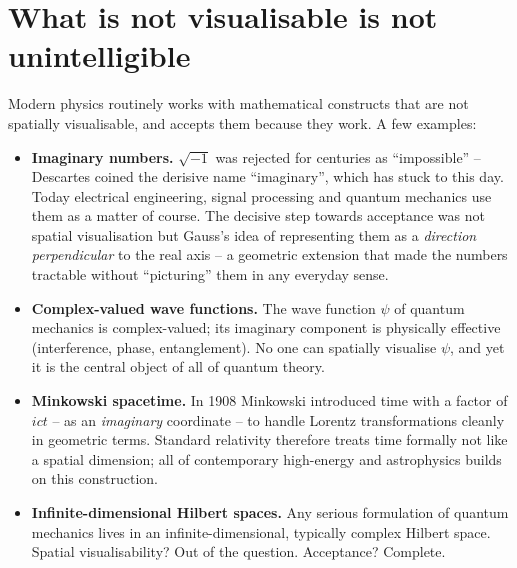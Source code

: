 \section{What is not visualisable is not unintelligible}

Modern physics routinely works with mathematical constructs that are
not spatially visualisable, and accepts them because they work. A few
examples:

\begin{itemize}[leftmargin=2em,itemsep=4pt,topsep=4pt]
  \item \textbf{Imaginary numbers.} $\sqrt{-1}$ was rejected for
        centuries as ``impossible'' -- Descartes coined the
        derisive name ``imaginary'', which has stuck to this day.
        Today electrical engineering, signal processing and quantum
        mechanics use them as a matter of course. The decisive step
        towards acceptance was not spatial visualisation but Gauss's
        idea of representing them as a \emph{direction perpendicular}
        to the real axis -- a geometric extension that made the
        numbers tractable without ``picturing'' them in any everyday
        sense.

  \item \textbf{Complex-valued wave functions.} The wave function
        $\psi$ of quantum mechanics is complex-valued; its imaginary
        component is physically effective (interference, phase,
        entanglement). No one can spatially visualise $\psi$, and
        yet it is the central object of all of quantum theory.

  \item \textbf{Minkowski spacetime.} In 1908 Minkowski introduced
        time with a factor of $ict$ -- as an \emph{imaginary}
        coordinate -- to handle Lorentz transformations cleanly in
        geometric terms. Standard relativity therefore treats time
        formally not like a spatial dimension; all of contemporary
        high-energy and astrophysics builds on this construction.

  \item \textbf{Infinite-dimensional Hilbert spaces.} Any serious
        formulation of quantum mechanics lives in an
        infinite-dimensional, typically complex Hilbert space.
        Spatial visualisability? Out of the question. Acceptance?
        Complete.


\end{itemize}

